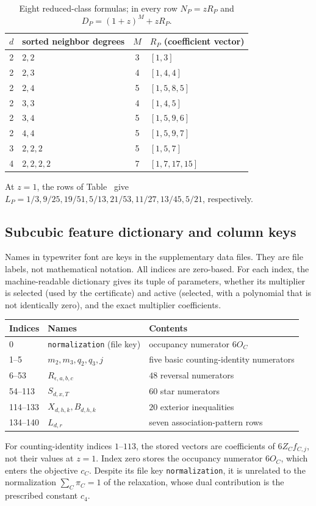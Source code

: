 \documentclass[11pt]{article}
\begin{document}
\begin{table}[ht]
\centering\small
\begin{tabular}{clcl}\toprule
$d$ & sorted neighbor degrees & $M$ & $R_P$ (coefficient vector)\\\midrule
2 & $2,2$ &3&$[1,3]$\\
2 & $2,3$ &4&$[1,4,4]$\\
2 & $2,4$ &5&$[1,5,8,5]$\\
2 & $3,3$ &4&$[1,4,5]$\\
2 & $3,4$ &5&$[1,5,9,6]$\\
2 & $4,4$ &5&$[1,5,9,7]$\\
3 & $2,2,2$ &5&$[1,5,7]$\\
4 & $2,2,2,2$ &7&$[1,7,17,15]$\\\bottomrule
\end{tabular}
\caption{Eight reduced-class formulas; in every row $N_P=zR_P$ and $D_P=(1+z)^M+zR_P$.}\label{tab:reducedpatterns}
\end{table}

At $z=1$, the rows of Table~ give $L_P=1/3,\allowbreak9/25,\allowbreak19/51,\allowbreak5/13,\allowbreak21/53,\allowbreak11/27,\allowbreak13/45,\allowbreak5/21$, respectively.

\FloatBarrier
\subsection{Subcubic feature dictionary and column keys}
Names in typewriter font are keys in the supplementary data files. They are file labels, not mathematical notation. All indices are zero-based. For each index, the machine-readable dictionary gives its tuple of parameters, whether its multiplier is selected (used by the certificate) and active (selected, with a polynomial that is not identically zero), and the exact multiplier coefficients.
\begin{center}\small
\begin{tabular}{lll}\toprule
Indices&Names&Contents\\\midrule
0&\texttt{normalization} (file key)&occupancy numerator $6O_C$\\
1--5&$m_2,m_3,q_2,q_3,j$&five basic counting-identity numerators\\
6--53&$R_{\epsilon,a,b,c}$&$48$ reversal numerators\\
54--113&$S_{d,x,T}$&$60$ star numerators\\
114--133&$X_{d,h,k},B_{d,h,k}$&$20$ exterior inequalities\\
134--140&$L_{d,r}$&seven association-pattern rows\\\bottomrule
\end{tabular}
\end{center}
For counting-identity indices $1$--$113$, the stored vectors are coefficients of $6Z_Cf_{C,j}$, not their values at $z=1$. Index zero stores the occupancy numerator $6O_C$, which enters the objective $c_C$. Despite its file key \texttt{normalization}, it is unrelated to the normalization $\sum_C\pi_C=1$ of the relaxation, whose dual contribution is the prescribed constant $c_4$.
\end{document}
